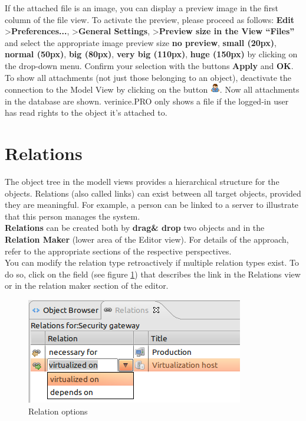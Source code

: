 \documentclass[a4paper,10pt]{book}
\begin{document}
If the attached file is an image, you can display a preview image in the first column of the file view. To activate the preview,
please proceed as follows: \textbf{Edit} \textgreater \textbf{Preferences...}, \textgreater \textbf{General Settings},
\textgreater \textbf{Preview size in the View ``Files''} and select the appropriate image preview size \textbf{no preview},
\textbf{small (20px)}, \textbf{normal (50px)}, \textbf{big (80px)}, \textbf{very big (110px)}, \textbf{huge (150px)} by clicking on the drop-down menu.
Confirm your selection with the buttons \textbf{Apply} and \textbf{OK}.
\newline\\
To show all attachments (not just those belonging to an object), deactivate the connection to the Model View by clicking on the button
\includegraphics[height=2ex]{Icon/Mitarbeiter.png}. Now all attachments in the database are shown. verinice.PRO only shows a file if the
logged-in user has read rights to the object it’s attached to.

\section{Relations}
The object tree in the modell views
provides a hierarchical structure for the objects.
Relations (also called links) can exist between all target objects, provided they are meaningful.
For example, a person can be linked to a server to illustrate that this person manages the system.
\newline\\
\textbf{Relations} can be created both by \textbf{drag\& drop} two objects and in the \textbf{Relation Maker}
(lower area of the Editor view). For details of the approach, refer to the appropriate sections of the respective
perspectives.
\newline\\
You can modify the relation type retroactively if multiple relation types exist. To do so, click on the field
(see figure \ref{Relation options}) that describes the link in the Relations view
or in the relation maker section of the editor.
\newline
\begin{figure}[htb!]
  \centering
  \includegraphics[scale=.7]{Screenshot/Verknue-en.png}
  \caption{\label{Relation options} Relation options}
\end{figure}
\end{document}

